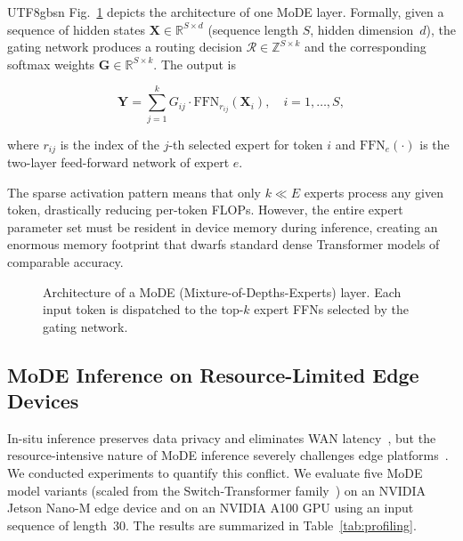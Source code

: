 \documentclass[conference]{IEEEtran}
\begin{document}
\begin{CJK*}{UTF8}{gbsn}
Fig.~\ref{fig:mode_arch} depicts the architecture of one MoDE layer.
Formally, given a sequence of hidden states
$\mathbf{X} \in \mathbb{R}^{S \times d}$ (sequence length $S$,
hidden dimension~$d$), the gating network produces a routing
decision $\mathcal{R} \in \mathbb{Z}^{S \times k}$ and the
corresponding softmax weights
$\mathbf{G} \in \mathbb{R}^{S \times k}$.  The output is

\begin{equation}
  \mathbf{Y} = \sum_{j=1}^{k} G_{ij} \cdot \mathrm{FFN}_{r_{ij}}(\mathbf{X}_{i}),
  \quad i = 1,\ldots,S,
  \label{eq:moe_output}
\end{equation}

\noindent
where $r_{ij}$ is the index of the $j$-th selected expert for
token $i$ and $\mathrm{FFN}_{e}(\cdot)$ is the two-layer
feed-forward network of expert $e$.

The sparse activation pattern means that only $k \ll E$ experts
process any given token, drastically reducing per-token FLOPs.
However, the entire expert parameter set must be resident in
device memory during inference, creating an enormous memory
footprint that dwarfs standard dense Transformer models of
comparable accuracy.

\begin{figure}[t]
  \centering
  \caption{Architecture of a MoDE (Mixture-of-Depths-Experts) layer.
           Each input token is dispatched to the top-$k$ expert FFNs
           selected by the gating network.}
  \label{fig:mode_arch}
\end{figure}

\subsection{MoDE Inference on Resource-Limited Edge Devices}
\label{sec:bg_edge}

In-situ inference preserves data privacy and eliminates WAN
latency~\cite{zeng2020coedge,ye2022ecofl}, but the resource-intensive
nature of MoDE inference severely challenges edge
platforms~\cite{aminabadi2022deepspeed}.  We conducted experiments to
quantify this conflict.  We evaluate five MoDE model variants (scaled
from the Switch-Transformer family~\cite{fedus2022switch}) on an
NVIDIA Jetson Nano-M edge device and on an NVIDIA A100 GPU using an
input sequence of length~30.  The results are summarized in
Table~\ref{tab:profiling}.


\end{CJK*}
\end{document}
